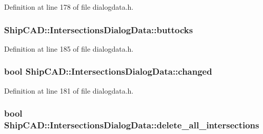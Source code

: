 Definition at line 178 of file dialogdata.\+h.

\subsubsection[{\texorpdfstring{buttocks}{buttocks}}]{ Ship\+C\+A\+D\+::\+Intersections\+Dialog\+Data\+::buttocks}\hypertarget{structShipCAD_1_1IntersectionsDialogData_a42e8714909a6cb3f20d4508e3ed3d7cd}{}\label{structShipCAD_1_1IntersectionsDialogData_a42e8714909a6cb3f20d4508e3ed3d7cd}


Definition at line 185 of file dialogdata.\+h.

\subsubsection[{\texorpdfstring{changed}{changed}}]{\setlength{\rightskip}{0pt plus 5cm}bool Ship\+C\+A\+D\+::\+Intersections\+Dialog\+Data\+::changed}\hypertarget{structShipCAD_1_1IntersectionsDialogData_a3f9b8b74cdacaed5cfdf2026dfaf2d75}{}\label{structShipCAD_1_1IntersectionsDialogData_a3f9b8b74cdacaed5cfdf2026dfaf2d75}


Definition at line 181 of file dialogdata.\+h.

\subsubsection[{\texorpdfstring{delete\+\_\+all\+\_\+intersections}{delete_all_intersections}}]{\setlength{\rightskip}{0pt plus 5cm}bool Ship\+C\+A\+D\+::\+Intersections\+Dialog\+Data\+::delete\+\_\+all\+\_\+intersections}\hypertarget{structShipCAD_1_1IntersectionsDialogData_ae423b73a2c8644594ac4c7f56125af9f}{}\label{structShipCAD_1_1IntersectionsDialogData_ae423b73a2c8644594ac4c7f56125af9f}


